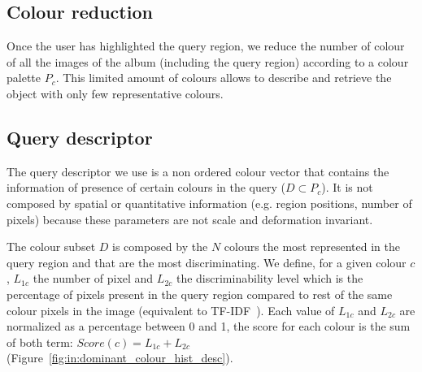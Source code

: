 \subsection{Colour reduction}
Once the user has highlighted the query region, we reduce the number of colour of all the images of the album (including the query region) according to a colour palette $P_c$.
This limited amount of colours allows to describe and retrieve the object with only few representative colours.




\subsection{Query descriptor}

The query descriptor we use is a non ordered colour vector that contains the information of presence of certain colours in the query ($D \subset P_c$). It is not composed by spatial or quantitative information (e.g. region positions, number of pixels) because these parameters are not scale and deformation invariant.%

The colour subset $D$ is composed by the $N$ colours the most represented in the query region and that are the most discriminating.
We define, for a given colour $c$, $L_{1c}$ the number of pixel and $L_{2c}$ the discriminability level which is the percentage of pixels present in the query region compared to rest of the same colour pixels in the image (equivalent to TF-IDF~\cite{salton1986introduction}).
Each value of $L_{1c}$ and $L_{2c}$ are normalized as a percentage between 0 and 1, the score for each colour is the sum of both term: $Score(c) = L_{1c} + L_{2c}$ (Figure~\ref{fig:in:dominant_colour_hist_desc}).


